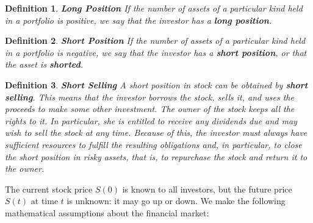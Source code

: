 \documentclass[letterpaper,10pt]{article}
\newtheorem{df}{Definition}[section]
\begin{document}
\begin{df}{\bf Long Position}
If the number of assets of a particular kind held in a portfolio is positive, we say that the investor has a {\bf long position}.
\end{df}

\begin{df}{\bf Short Position}
If the number of assets of a particular kind held in a portfolio is negative, we say that the investor has a {\bf short position}, or that the asset is {\bf shorted}.
\end{df}

\begin{df}{\bf Short Selling}
A short position in stock can be obtained by {\bf short selling}.  This means that the investor borrows the stock, sells it, and uses the proceeds to make some other investment. The owner of the stock keeps all the rights to it. In particular, she is entitled to receive any dividends due and may wish to sell the stock at any time. Because of this, the investor must always have sufficient resources to fulfill the resulting obligations and, in particular, to close the short position in risky assets, that is, to repurchase the stock and return it to the owner. 
\end{df}


The current stock price $S(0)$ is known to all investors, but the future price $S(t)$ at time $t$ is unknown: it may go up or down.  We make the following mathematical assumptions about the financial market:
\end{document}
